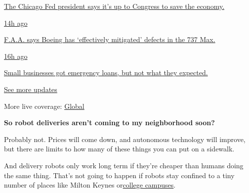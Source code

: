 \href{https://www.nytimes.com/live/2020/08/03/business/stock-market-today-coronavirus?action=click\&pgtype=Article\&state=default\&region=MAIN_CONTENT_1\&context=storylines_live_updates\#the-chicago-fed-president-says-its-up-to-congress-to-save-the-economy}{The
Chicago Fed president says it's up to Congress to save the economy.}

\href{https://www.nytimes.com/live/2020/08/03/business/stock-market-today-coronavirus?action=click\&pgtype=Article\&state=default\&region=MAIN_CONTENT_1\&context=storylines_live_updates\#faa-says-boeing-has-effectively-mitigated-defects-in-the-737-max}{14h
ago}

\href{https://www.nytimes.com/live/2020/08/03/business/stock-market-today-coronavirus?action=click\&pgtype=Article\&state=default\&region=MAIN_CONTENT_1\&context=storylines_live_updates\#faa-says-boeing-has-effectively-mitigated-defects-in-the-737-max}{F.A.A.
says Boeing has `effectively mitigated' defects in the 737 Max.}

\href{https://www.nytimes.com/live/2020/08/03/business/stock-market-today-coronavirus?action=click\&pgtype=Article\&state=default\&region=MAIN_CONTENT_1\&context=storylines_live_updates\#small-businesses-got-emergency-loans-but-not-what-they-expected}{16h
ago}

\href{https://www.nytimes.com/live/2020/08/03/business/stock-market-today-coronavirus?action=click\&pgtype=Article\&state=default\&region=MAIN_CONTENT_1\&context=storylines_live_updates\#small-businesses-got-emergency-loans-but-not-what-they-expected}{Small
businesses got emergency loans, but not what they expected.}

\href{https://www.nytimes.com/live/2020/08/03/business/stock-market-today-coronavirus?action=click\&pgtype=Article\&state=default\&region=MAIN_CONTENT_1\&context=storylines_live_updates}{See
more updates}

More live coverage:
\href{https://www.nytimes.com/2020/08/04/world/coronavirus-covid-19.html?action=click\&pgtype=Article\&state=default\&region=MAIN_CONTENT_1\&context=storylines_live_updates}{Global}

\textbf{So robot deliveries aren't coming to my neighborhood soon?}

Probably not. Prices will come down, and autonomous technology will
improve, but there are limits to how many of these things you can put on
a sidewalk.

And delivery robots only work long term if they're cheaper than humans
doing the same thing. That's not going to happen if robots stay confined
to a tiny number of places like Milton Keynes
or\href{https://www.washingtonpost.com/technology/2019/03/25/how-gmu-students-eating-habits-changed-when-delivery-robots-invaded-their-campus/}{college
campuses}.

